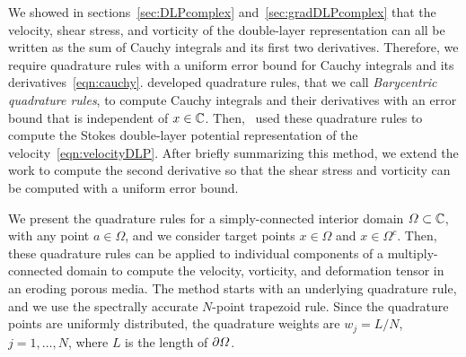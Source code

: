 \documentclass{jfm}
\begin{document}
We showed in sections~\ref{sec:DLPcomplex} and~\ref{sec:gradDLPcomplex}
that the velocity, shear stress, and vorticity of the double-layer
representation can all be written as the sum of Cauchy integrals and its
first two derivatives.  Therefore, we require quadrature rules with a
uniform error bound for Cauchy integrals and its
derivatives~\eqref{eqn:cauchy}. \citet{ioa-pap-per1991} developed
quadrature rules, that we call {\em Barycentric quadrature rules}, to
compute Cauchy integrals and their derivatives with an error bound that
is independent of $x \in {\mathbb{C}}$.  Then,~\citet{bar-wu-vee2015} used these
quadrature rules to compute the Stokes double-layer potential
representation of the velocity~\eqref{eqn:velocityDLP}. After briefly
summarizing this method, we extend the work to compute the second
derivative so that the shear stress and vorticity can be computed with a
uniform error bound. 

We present the quadrature rules for a simply-connected interior domain
$\varOmega \subset {\mathbb{C}}$, with any point $a \in \Omega$, and we consider
target points $x \in \Omega$ and $x \in \Omega^c$. Then, these
quadrature rules can be applied to individual components of a
multiply-connected domain to compute the velocity, vorticity, and
deformation tensor in an eroding porous media.  The method starts with
an underlying quadrature rule, and we use the spectrally accurate
$N$-point trapezoid rule.  Since the quadrature points are uniformly
distributed, the quadrature weights are $w_j = L/N$, $j=1,\ldots,N$,
where $L$ is the length of ${\partial}\varOmega$.
\end{document}
